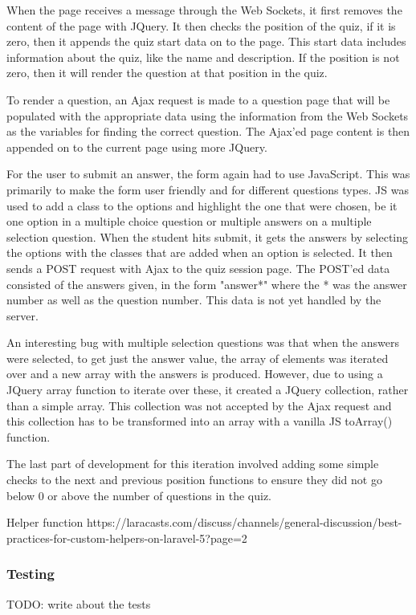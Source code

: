 When the page receives a message through the Web Sockets, it first removes the content of the page with JQuery. It then checks the position of the quiz, if it is zero, then it appends the quiz start data on to the page. This start data includes information about the quiz, like the name and description. If the position is not zero, then it will render the question at that position in the quiz.

To render a question, an Ajax request is made to a question page that will be populated with the appropriate data using the information from the Web Sockets as the variables for finding the correct question. The Ajax'ed page content is then appended on to the current page using more JQuery.

For the user to submit an answer, the form again had to use JavaScript. This was primarily to make the form user friendly and for different questions types. JS was used to add a class to the options and highlight the one that were chosen, be it one option in a multiple choice question or multiple answers on a multiple selection question. When the student hits submit, it gets the answers by selecting the options with the classes that are added when an option is selected. It then sends a POST request with Ajax to the quiz session page. The POST'ed data consisted of the answers given, in the form "answer*" where the * was the answer number as well as the question number. This data is not yet handled by the server.

An interesting bug with multiple selection questions was that when the answers were selected, to get just the answer value, the array of elements was iterated over and a new array with the answers is produced. However, due to using a JQuery array function to iterate over these, it created a JQuery collection, rather than a simple array. This collection was not accepted by the Ajax request and this collection has to be transformed into an array with a vanilla JS toArray() function.

The last part of development for this iteration involved adding some simple checks to the next and previous position functions to ensure they did not go below 0 or above the number of questions in the quiz.

Helper function https://laracasts.com/discuss/channels/general-discussion/best-practices-for-custom-helpers-on-laravel-5?page=2
\subsubsection{Testing}
TODO: write about the tests
